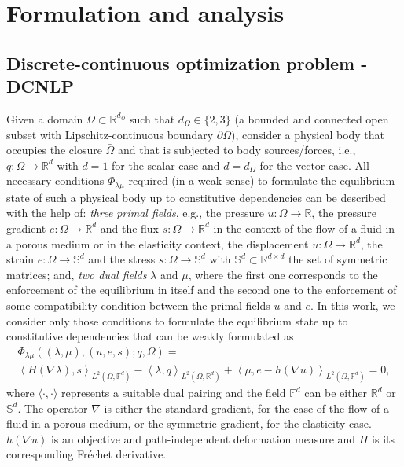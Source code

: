\section{Formulation and analysis}

\subsection{Discrete-continuous optimization problem - DCNLP}

Given a domain $\Omega \subset \mathbb{R}^{d_{\Omega}}$ such that $d_{\Omega}\in\{2,3\}$ (a bounded and connected open subset with Lipschitz-continuous boundary $\partial \Omega$), consider a physical body that occupies the closure $\bar{\Omega}$ and that is subjected to body sources/forces, i.e., $q: \Omega \to \mathbb{R}^d$ with $d = 1$ for the scalar case and $d = d_\Omega$ for the vector case. All necessary conditions $\Phi_{\lambda\mu}$ required (in a weak sense) to formulate the equilibrium state of such a physical body up to constitutive dependencies can be described with the help of: \textit{three primal fields}, e.g., the pressure $u: \Omega \to \mathbb{R}$, the pressure gradient $e: \Omega \to \mathbb{R}^d$ and the flux $s: \Omega \to \mathbb{R}^d$ in the context of the flow of a fluid in a porous medium or in the elasticity context, the displacement $u: \Omega \to \mathbb{R}^d$, the strain $e: \Omega \to \mathbb{S}^d$ and the stress $s: \Omega \to \mathbb{S}^d$ with $\mathbb{S}^d \subset \mathbb{R}^{d \times d}$ the set of symmetric matrices; and, \textit{two dual fields} $\lambda$ and $\mu$, where the first one corresponds to the enforcement of the equilibrium in itself and the second one to the enforcement of some compatibility condition between the primal fields $u$ and $e$. In this work, we consider only those conditions to formulate the equilibrium state up to constitutive dependencies that can be weakly formulated as
\begin{multline}
\Phi_{\lambda \mu}((\lambda, \mu), (u, e, s); q, \Omega) = \\
\left\langle H (\nabla \lambda), s \right\rangle_{L^2(\Omega, \mathbb{F}^d)}-
\left\langle \lambda, q \right\rangle_{L^2(\Omega,\mathbb{R}^d)}+
\left\langle \mu, e- h(\nabla u) \right\rangle_{L^2(\Omega,\mathbb{F}^d)} = 0,
\end{multline}
where $\langle \cdot , \cdot \rangle$ represents a suitable dual pairing and the field $\mathbb{F}^d$ can be either $\mathbb{R}^d$ or $\mathbb{S}^d$. The operator $\nabla$ is either the standard gradient, for the case of the flow of a fluid in a porous medium, or the symmetric gradient, for the elasticity case. $h(\nabla u)$ is an objective and path-independent deformation measure and $H$ is its corresponding Fr\'echet derivative.   


